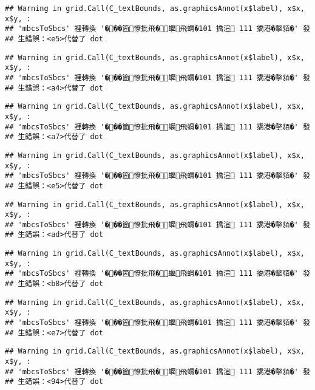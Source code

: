 \documentclass[
]{article}
\begin{document}
\begin{verbatim}
## Warning in grid.Call(C_textBounds, as.graphicsAnnot(x$label), x$x, x$y, :
## 'mbcsToSbcs' 裡轉換 '���箇憭批飛�蝘飛蝟�101 撟渲 111 撟港�摮貊�' 發
## 生錯誤：<e5>代替了 dot
\end{verbatim}

\begin{verbatim}
## Warning in grid.Call(C_textBounds, as.graphicsAnnot(x$label), x$x, x$y, :
## 'mbcsToSbcs' 裡轉換 '���箇憭批飛�蝘飛蝟�101 撟渲 111 撟港�摮貊�' 發
## 生錯誤：<a4>代替了 dot
\end{verbatim}

\begin{verbatim}
## Warning in grid.Call(C_textBounds, as.graphicsAnnot(x$label), x$x, x$y, :
## 'mbcsToSbcs' 裡轉換 '���箇憭批飛�蝘飛蝟�101 撟渲 111 撟港�摮貊�' 發
## 生錯誤：<a7>代替了 dot
\end{verbatim}

\begin{verbatim}
## Warning in grid.Call(C_textBounds, as.graphicsAnnot(x$label), x$x, x$y, :
## 'mbcsToSbcs' 裡轉換 '���箇憭批飛�蝘飛蝟�101 撟渲 111 撟港�摮貊�' 發
## 生錯誤：<e5>代替了 dot
\end{verbatim}

\begin{verbatim}
## Warning in grid.Call(C_textBounds, as.graphicsAnnot(x$label), x$x, x$y, :
## 'mbcsToSbcs' 裡轉換 '���箇憭批飛�蝘飛蝟�101 撟渲 111 撟港�摮貊�' 發
## 生錯誤：<ad>代替了 dot
\end{verbatim}

\begin{verbatim}
## Warning in grid.Call(C_textBounds, as.graphicsAnnot(x$label), x$x, x$y, :
## 'mbcsToSbcs' 裡轉換 '���箇憭批飛�蝘飛蝟�101 撟渲 111 撟港�摮貊�' 發
## 生錯誤：<b8>代替了 dot
\end{verbatim}

\begin{verbatim}
## Warning in grid.Call(C_textBounds, as.graphicsAnnot(x$label), x$x, x$y, :
## 'mbcsToSbcs' 裡轉換 '���箇憭批飛�蝘飛蝟�101 撟渲 111 撟港�摮貊�' 發
## 生錯誤：<e7>代替了 dot
\end{verbatim}

\begin{verbatim}
## Warning in grid.Call(C_textBounds, as.graphicsAnnot(x$label), x$x, x$y, :
## 'mbcsToSbcs' 裡轉換 '���箇憭批飛�蝘飛蝟�101 撟渲 111 撟港�摮貊�' 發
## 生錯誤：<94>代替了 dot
\end{verbatim}
\end{document}
